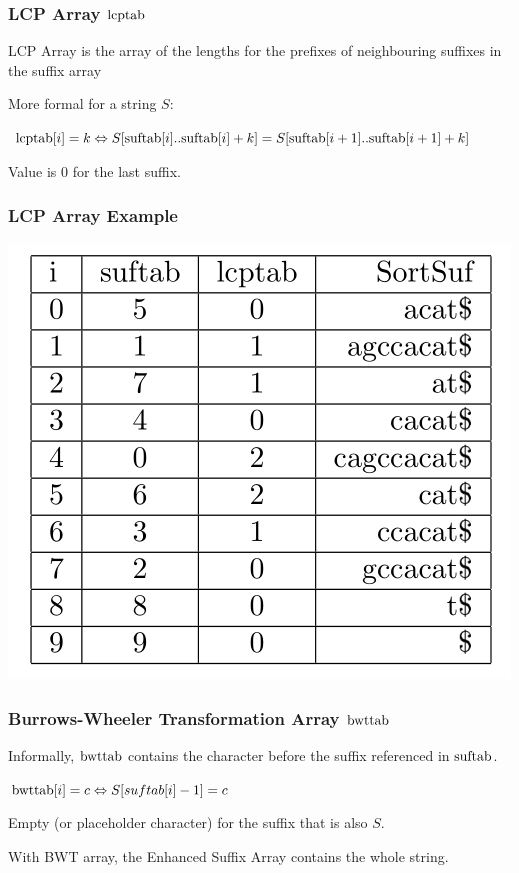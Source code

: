 \documentclass[compress,handout]{beamer} %
\begin{document}
\begin{frame}
	\frametitle{LCP Array $\hbox{lcptab}$}
	LCP Array is the array of the lengths for the prefixes of
	neighbouring suffixes in the suffix array

	More formal for a string $S$:

	$\hbox{lcptab}[i]=k \Leftrightarrow S[\hbox{suftab}[i]..\hbox{suftab}[i]+k]=S[\hbox{suftab}[i+1]..\hbox{suftab}[i+1]+k]$

	Value is $0$ for the last suffix.
\end{frame}

\begin{frame}
	\frametitle{LCP Array Example}
	\includegraphics[width=\textwidth, height=\textheight, keepaspectratio=true]{esa_example}
\end{frame}

\begin{frame}
	\frametitle{Burrows-Wheeler Transformation Array $\hbox{bwttab}$}
	Informally, $\hbox{bwttab}$ contains the character before the
	suffix referenced in $\hbox{suftab}$.

	$\hbox{bwttab}[i]=c \Leftrightarrow S[suftab[i]-1]=c$

	Empty (or placeholder character) for the suffix that is also $S$.

	With BWT array, the Enhanced Suffix Array contains the whole
	string.
\end{frame}
\end{document}
